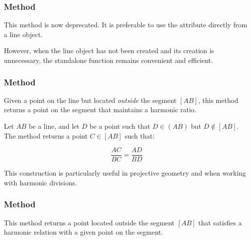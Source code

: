 \subsubsection{Method }
\label{ssub:method_line_midpoint}

This method is now deprecated. It is preferable to use the attribute  directly from a line object.

\medskip
\noindent
However, when the line object has not been created and its creation is unnecessary, the standalone function  remains convenient and efficient.


\begin{center}
\end{center}

\subsubsection{Method }
\label{ssub:method_line_harmonic_int}

Given a point on the line but located \emph{outside} the segment $[AB]$, this method returns a point on the segment that maintains a harmonic ratio.

\medskip
\noindent
Let $AB$ be a line, and let $D$ be a point such that $D \in (AB)$ but $D \not\in [AB]$. The method returns a point $C \in [AB]$ such that:

\[
\frac{AC}{BC} = \frac{AD}{BD}
\]

\noindent
This construction is particularly useful in projective geometry and when working with harmonic divisions.

\vspace{2em}
\begin{tkzexample}
\begin{center}
\end{center}

\end{tkzexample}

\subsubsection{Method }
\label{ssub:method_imeth_line_harmonic__ext_pt}
This method returns a point located outside the segment $[AB]$ that satisfies a harmonic relation with a given point on the segment.

